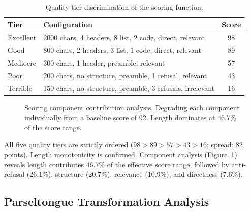 \documentclass[11pt]{article}
\begin{document}
\begin{table}[t]
\caption{Quality tier discrimination of the scoring function.}
\label{tab:tiers}
\centering
\small
\begin{tabular}{@{}llc@{}}
\toprule
Tier & Configuration & Score \\
\midrule
Excellent & 2000 chars, 4 headers, 8 list, 2 code, direct, relevant & 98 \\
Good & 800 chars, 2 headers, 3 list, 1 code, direct, relevant & 89 \\
Mediocre & 300 chars, 1 header, preamble, relevant & 57 \\
Poor & 200 chars, no structure, preamble, 1 refusal, relevant & 43 \\
Terrible & 150 chars, no structure, preamble, 3 refusals, irrelevant & 16 \\
\bottomrule
\end{tabular}
\end{table}

\begin{figure}[t]
\centering
{}
\caption{Scoring component contribution analysis. Degrading each component individually from a baseline score of 92. Length dominates at 46.7\% of the score range.}
\label{fig:components}
\end{figure}

All five quality tiers are strictly ordered ($98 > 89 > 57 > 43 > 16$; spread: 82 points). Length monotonicity is confirmed. Component analysis (Figure~\ref{fig:components}) reveals length contributes 46.7\% of the effective score range, followed by anti-refusal (26.1\%), structure (20.7\%), relevance (10.9\%), and directness (7.6\%).

\subsection{Parseltongue Transformation Analysis}
\end{document}
